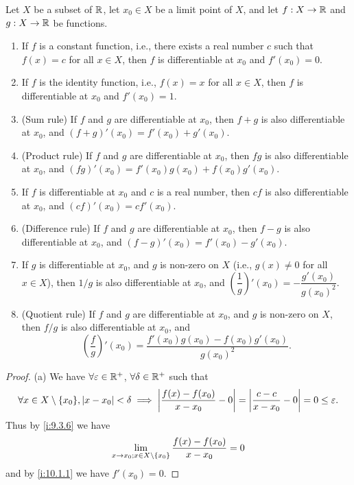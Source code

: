 \begin{thm}\label{i:10.1.13}
  Let \(X\) be a subset of \(\mathbb{R}\), let \(x_0 \in X\) be a limit point of \(X\), and let \(f : X \to \mathbb{R}\) and \(g : X \to \mathbb{R}\) be functions.
  \begin{enumerate}
    \item If \(f\) is a constant function, i.e., there exists a real number \(c\) such that \(f(x) = c\) for all \(x \in X\), then \(f\) is differentiable at \(x_0\) and \(f'(x_0) = 0\).
    \item If \(f\) is the identity function, i.e., \(f(x) = x\) for all \(x \in X\), then \(f\) is differentiable at \(x_0\) and \(f'(x_0) = 1\).
    \item (Sum rule)
          If \(f\) and \(g\) are differentiable at \(x_0\), then \(f + g\) is also differentiable at \(x_0\), and \((f + g)'(x_0) = f'(x_0) + g'(x_0)\).
    \item (Product rule)
          If \(f\) and \(g\) are differentiable at \(x_0\), then \(fg\) is also differentiable at \(x_0\), and \((fg)'(x_0) = f'(x_0)g(x_0) + f(x_0)g'(x_0)\).
    \item If \(f\) is differentiable at \(x_0\) and \(c\) is a real number, then \(cf\) is also differentiable at \(x_0\), and \((cf)'(x_0) = cf'(x_0)\).
    \item (Difference rule)
          If \(f\) and \(g\) are differentiable at \(x_0\), then \(f - g\) is also differentiable at \(x_0\), and \((f - g)'(x_0) = f'(x_0) - g'(x_0)\).
    \item If \(g\) is differentiable at \(x_0\), and \(g\) is non-zero on \(X\) (i.e., \(g(x) \neq 0\) for all \(x \in X\)), then \(1 / g\) is also differentiable at \(x_0\), and \((\dfrac{1}{g})'(x_0) = -\dfrac{g'(x_0)}{g(x_0)^2}\).
    \item (Quotient rule)
          If \(f\) and \(g\) are differentiable at \(x_0\), and \(g\) is non-zero on \(X\), then \(f / g\) is also differentiable at \(x_0\), and
          \[
            (\dfrac{f}{g})'(x_0) = \dfrac{f'(x_0) g(x_0) - f(x_0) g'(x_0)}{g(x_0)^2}.
          \]
  \end{enumerate}
\end{thm}

\begin{proof}{(a)}
  We have \(\forall \varepsilon \in \mathbb{R}^+\), \(\forall \delta \in \mathbb{R}^+\) such that
  \[
    \forall x \in X \setminus \set{x_0}, \abs{x - x_0} < \delta \implies \abs{\dfrac{f(x) - f(x_0)}{x - x_0} - 0} = \abs{\dfrac{c - c}{x - x_0} - 0} = 0 \leq \varepsilon.
  \]
  Thus by \cref{i:9.3.6} we have
  \[
    \lim_{x \to x_0 ; x \in X \setminus \left\lbrace x_0\right\rbrace} \dfrac{f(x) - f(x_0)}{x - x_0} = 0
  \]
  and by \cref{i:10.1.1} we have \(f'(x_0) = 0\).
\end{proof}

